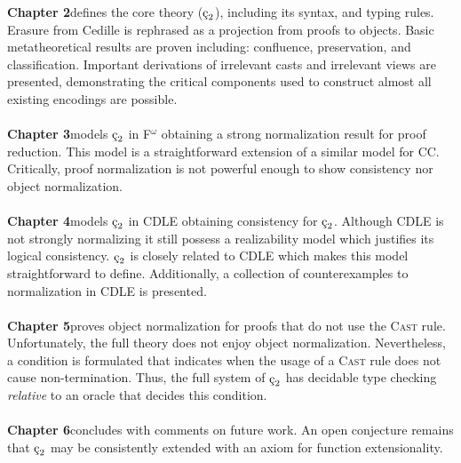 \textbf{Chapter 2}\quad defines the core theory ($\ced$), including its syntax, and typing rules.
Erasure from Cedille is rephrased as a projection from proofs to objects.
Basic metatheoretical results are proven including: confluence, preservation, and classification.
Important derivations of irrelevant casts and irrelevant views are presented, demonstrating the critical components used to construct almost all existing encodings are possible.
\\ \\
\textbf{Chapter 3}\quad models $\ced$ in F$^\omega$ obtaining a strong normalization result for proof reduction.
This model is a straightforward extension of a similar model for CC.
Critically, proof normalization is not powerful enough to show consistency nor object normalization.
\\ \\
\textbf{Chapter 4}\quad models $\ced$ in CDLE obtaining consistency for $\ced$.
Although CDLE is not strongly normalizing it still possess a realizability model which justifies its logical consistency.
$\ced$ is closely related to CDLE which makes this model straightforward to define.
Additionally, a collection of counterexamples to normalization in CDLE is presented.
\\ \\
\textbf{Chapter 5}\quad proves object normalization for proofs that do not use the \textsc{Cast} rule.
Unfortunately, the full theory does not enjoy object normalization.
Nevertheless, a condition is formulated that indicates when the usage of a \textsc{Cast} rule does not cause non-termination.
Thus, the full system of $\ced$ has decidable type checking \textit{relative} to an oracle that decides this condition.
\\ \\
\textbf{Chapter 6}\quad concludes with comments on future work.
An open conjecture remains that $\ced$ may be consistently extended with an axiom for function extensionality.
